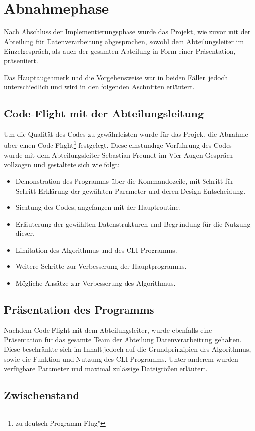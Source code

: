 \section{Abnahmephase}
\label{section:abnahmephase}
Nach Abschluss der Implementierungsphase wurde das Projekt, wie zuvor mit der
Abteilung für Datenverarbeitung abgesprochen, sowohl dem Abteilungsleiter im Einzelgespräch,
als auch der gesamten Abteilung in Form einer Präsentation, präsentiert.

Das Hauptaugenmerk und die Vorgehensweise war in beiden Fällen jedoch unterschiedlich
und wird in den folgenden Aschnitten erläutert.

\subsection{Code-Flight mit der Abteilungsleitung}

Um die Qualität des Codes zu gewährleisten wurde für das Projekt die Abnahme über einen Code-Flight\footnote{zu deutsch \"Programm-Flug"} festgelegt. Diese einstündige
Vorführung des Codes wurde mit dem Abteilungsleiter Sebastian Freundt im
Vier-Augen-Gespräch vollzogen und gestaltete sich wie folgt:

\begin{itemize}
    \item Demonstration des Programms über die Kommandozeile, mit Schritt-für-Schritt Erklärung der gewählten Parameter und deren Design-Entscheidung.
    \item Sichtung des Codes, angefangen mit der Hauptroutine.
    \item Erläuterung der gewählten Datenstrukturen und Begründung für die Nutzung dieser.
    \item Limitation des Algorithmus und des CLI-Programms.
    \item Weitere Schritte zur Verbesserung der Hauptprogramms.
    \item Mögliche Ansätze zur Verbesserung des Algorithmus.
\end{itemize}

\subsection{Präsentation des Programms}

Nachdem Code-Flight mit dem Abteilungsleiter, wurde ebenfalls
eine Präsentation für das gesamte Team der Abteilung Datenverarbeitung gehalten.
Diese beschränkte sich im Inhalt jedoch auf die Grundprinzipien des Algorithmus, sowie
die Funktion und Nutzung des CLI-Programms. Unter anderem wurden verfügbare
Parameter und maximal zulässige Dateigrößen erläutert.

\subsection{Zwischenstand}
